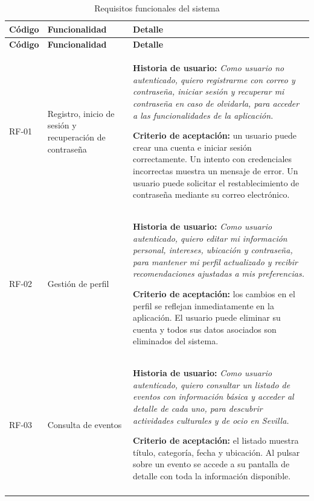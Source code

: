 {\small
\setlength{\tabcolsep}{4pt}
\renewcommand{\arraystretch}{1.25}
\begin{longtable}{@{}>{\raggedright\arraybackslash}p{} >{\raggedright\arraybackslash}p{} >{\raggedright\arraybackslash}p{}@{}}
\caption{Requisitos funcionales del sistema}
\label{tab:requisitos_funcionales}\\
\toprule
\textbf{Código} & \textbf{Funcionalidad} & \textbf{Detalle} \\
\midrule
\endfirsthead
\toprule
\textbf{Código} & \textbf{Funcionalidad} & \textbf{Detalle} \\
\midrule
\endhead
\bottomrule
\endfoot
RF-01 & Registro, inicio de sesión y recuperación de contraseña & \textbf{Historia de usuario:} \textit{Como usuario no autenticado, quiero registrarme con correo y contraseña, iniciar sesión y recuperar mi contraseña en caso de olvidarla, para acceder a las funcionalidades de la aplicación.}\par\vspace{0.05cm}\textbf{Criterio de aceptación:} un usuario puede crear una cuenta e iniciar sesión correctamente. Un intento con credenciales incorrectas muestra un mensaje de error. Un usuario puede solicitar el restablecimiento de contraseña mediante su correo electrónico. \\
\addlinespace
RF-02 & Gestión de perfil & \textbf{Historia de usuario:} \textit{Como usuario autenticado, quiero editar mi información personal, intereses, ubicación y contraseña, para mantener mi perfil actualizado y recibir recomendaciones ajustadas a mis preferencias.}\par\vspace{0.05cm}\textbf{Criterio de aceptación:} los cambios en el perfil se reflejan inmediatamente en la aplicación. El usuario puede eliminar su cuenta y todos sus datos asociados son eliminados del sistema. \\
\addlinespace
RF-03 & Consulta de eventos & \textbf{Historia de usuario:} \textit{Como usuario autenticado, quiero consultar un listado de eventos con información básica y acceder al detalle de cada uno, para descubrir actividades culturales y de ocio en Sevilla.}\par\vspace{0.05cm}\textbf{Criterio de aceptación:} el listado muestra título, categoría, fecha y ubicación. Al pulsar sobre un evento se accede a su pantalla de detalle con toda la información disponible. \\
\addlinespace

\end{longtable}}
